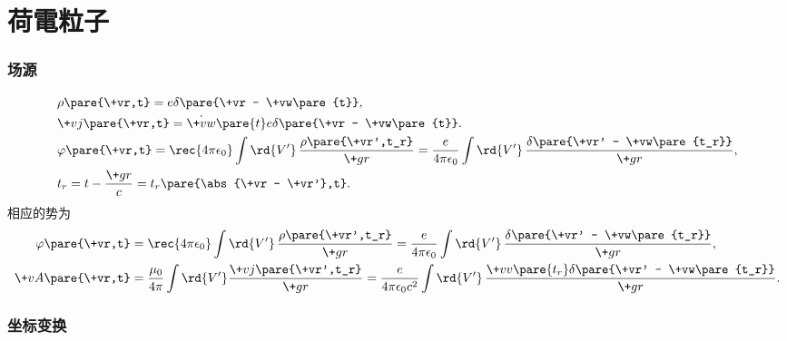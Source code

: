 \documentclass[hidelinks]{ctexart}
\begin{document}
\section{荷電粒子} %
\label{sec:荷電粒子}

\label{sub:Lienard_Wirchert势}

\subsubsection{场源} %
\label{ssub:场源}

\vspace{-2\baselineskip}
\begin{align*}
    & \rho\pare{\+vr,t} = e\delta\pare{\+vr - \+vw\pare{t}}, \\
    & \+vj\pare{\+vr,t} = \dot{\+vw}\pare{t} e\delta\pare{\+vr - \+vw\pare{t}}. \\
    & \varphi\pare{\+vr,t} = \rec{4\pi\epsilon_0} \int \rd{V'}\, \frac{\rho\pare{\+vr',t_r}}{\+gr} = \frac{e}{4\pi\epsilon_0}\int \rd{V'}\, \frac{\delta\pare{\+vr' - \+vw\pare{t_r}}}{\+gr}, \\
    & t_r = t - \frac{\+gr}{c} = t_r\pare{\abs{\+vr - \+vr'},t}.
\end{align*}
相应的势为
\begin{align*}
    \varphi\pare{\+vr,t} &= \rec{4\pi\epsilon_0}\int \rd{V'}\, \frac{\rho\pare{\+vr',t_r}}{\+gr} = \frac{e}{4\pi\epsilon_0} \int \rd{V'}\, \frac{\delta\pare{\+vr' - \+vw\pare{t_r}}}{\+gr}, \\
    \+vA\pare{\+vr,t} &= \frac{\mu_0}{4\pi}\int \rd{V'} \frac{\+vj\pare{\+vr',t_r}}{\+gr} = \frac{e}{4\pi\epsilon_0 c^2}\int \rd{V'}\, \frac{\+vv\pare{t_r}\delta\pare{\+vr' - \+vw\pare{t_r}}}{\+gr}.
\end{align*}


\subsubsection{坐标变换} %
\label{ssub:坐标变换}
\end{document}
